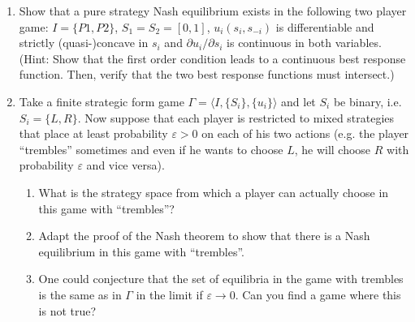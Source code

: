 \documentclass[a4paper,12pt]{article}
\begin{document}
\begin{enumerate}
\item Show that a pure strategy Nash equilibrium exists in the following two player game: $I=\{P1,P2\}$, $S_1=S_2=[0,1]$, $u_i(s_i,s_{-i})$ is differentiable and strictly (quasi-)concave in $s_i$ and $\partial u_i/\partial s_i$ is continuous in both variables.\\
  (Hint: Show that the first order condition leads to a continuous best response function. Then, verify that the two best response functions must intersect.)
\item Take a finite strategic form game $\Gamma=\langle I,\{S_i\},\{u_i\} \rangle$ and let $S_i$ be binary, i.e. $S_i=\{L,R\}$. Now suppose that each player is restricted to mixed strategies that place at least probability $\varepsilon >0$ on each of his two actions (e.g. the player ``trembles'' sometimes and even if he wants to choose $L$, he will choose $R$ with probability $\varepsilon $ and vice versa).
  \begin{enumerate}
  \item What is the strategy space from which a player can actually
    choose in this game with ``trembles''?
  \item Adapt the proof of the Nash theorem to show that there is a Nash equilibrium in this game  with ``trembles''.
    \item One could conjecture that the set of equilibria in the game with trembles is the same as in $\Gamma$ in the limit if $\varepsilon \rightarrow 0$. Can you find a game where this is not true?
\end{enumerate}
\end{enumerate}
\end{document}
